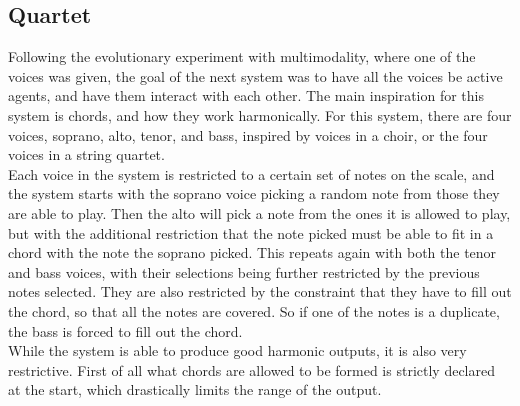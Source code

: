 \documentclass[a4paper,english]{report}
\begin{document}
	\subsection{Quartet}
	Following the evolutionary experiment with multimodality, where one of the voices was given, the goal of the next system was to have all the voices be active agents, and have them interact with each other. The main inspiration for this system is chords, and how they work harmonically. For this system, there are four voices, soprano, alto, tenor, and bass, inspired by voices in a choir, or the four voices in a string quartet. \\
	Each voice in the system is restricted to a certain set of notes on the scale, and the system starts with the soprano voice picking a random note from those they are able to play. Then the alto will pick a note from the ones it is allowed to play, but with the additional restriction that the note picked must be able to fit in a chord with the note the soprano picked. This repeats again with both the tenor and bass voices, with their selections being further restricted by the previous notes selected. They are also restricted by the constraint that they have to fill out the chord, so that all the notes are covered. So if one of the notes is a duplicate, the bass is forced to fill out the chord. \\
	While the system is able to produce good harmonic outputs, it is also very restrictive. First of all what chords are allowed to be formed is strictly declared at the start, which drastically limits the range of the output.
	
\end{document}
